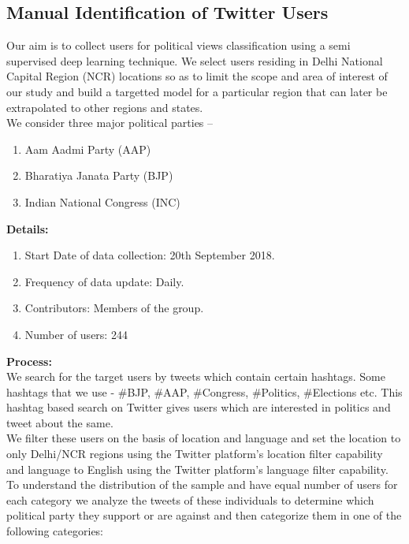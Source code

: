 \documentclass[a4paper,11pt]{article}
\begin{document}
\subsection{Manual Identification of Twitter Users}
Our aim is to collect users for political views classification using a semi supervised deep learning technique.
We select users residing in Delhi National Capital Region (NCR) locations so as to limit the scope and area of interest of our study and build a targetted model for a particular region that can later be extrapolated to other regions and states.
\medskip\\
We consider three major political parties –
\begin{enumerate}
    \item Aam Aadmi Party (AAP)
    \item Bharatiya Janata Party (BJP)
    \item Indian National Congress (INC)
\end{enumerate}
\medskip
\medskip
\textbf{Details:}
\begin{enumerate}
    \item Start Date of data collection: 20th September 2018.    \item Frequency of data update: Daily.
    \item Contributors: Members of the group.
    \item Number of users: 244
\end{enumerate}
\textbf{Process:}
\medskip\\
We search for the target users by tweets which contain certain hashtags. Some hashtags that we use - \#BJP, \#AAP, \#Congress, \#Politics, \#Elections etc. This hashtag based search on Twitter gives users which are interested in politics and tweet about the same. \\
We filter these users on the basis of location and language and set the location to only Delhi/NCR regions using the Twitter platform’s location filter capability and language to English using the Twitter platform's language filter capability.
\medskip\\
To understand the distribution of the sample and have equal number of users for each category we analyze the tweets of these individuals to determine which political party they support or are against and then categorize them in one of the following categories:
\end{document}
